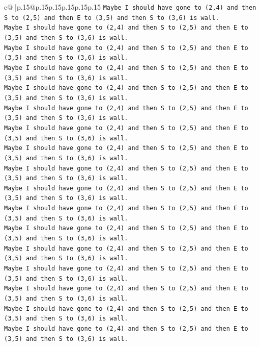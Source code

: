 \documentclass{article}
\begin{document}
{\begin{supertabular}{c@{$\;$}|p{.15\linewidth}@{}p{.15\linewidth}p{.15\linewidth}p{.15\linewidth}p{.15\linewidth}p{.15\linewidth}}
{{{\texttt{Maybe I should have gone to (2,4) and then S to (2,5) and then E to (3,5) and then S to (3,6) is wall.} \\
\texttt{Maybe I should have gone to (2,4) and then S to (2,5) and then E to (3,5) and then S to (3,6) is wall.} \\
\texttt{Maybe I should have gone to (2,4) and then S to (2,5) and then E to (3,5) and then S to (3,6) is wall.} \\
\texttt{Maybe I should have gone to (2,4) and then S to (2,5) and then E to (3,5) and then S to (3,6) is wall.} \\
\texttt{Maybe I should have gone to (2,4) and then S to (2,5) and then E to (3,5) and then S to (3,6) is wall.} \\
\texttt{Maybe I should have gone to (2,4) and then S to (2,5) and then E to (3,5) and then S to (3,6) is wall.} \\
\texttt{Maybe I should have gone to (2,4) and then S to (2,5) and then E to (3,5) and then S to (3,6) is wall.} \\
\texttt{Maybe I should have gone to (2,4) and then S to (2,5) and then E to (3,5) and then S to (3,6) is wall.} \\
\texttt{Maybe I should have gone to (2,4) and then S to (2,5) and then E to (3,5) and then S to (3,6) is wall.} \\
\texttt{Maybe I should have gone to (2,4) and then S to (2,5) and then E to (3,5) and then S to (3,6) is wall.} \\
\texttt{Maybe I should have gone to (2,4) and then S to (2,5) and then E to (3,5) and then S to (3,6) is wall.} \\
\texttt{Maybe I should have gone to (2,4) and then S to (2,5) and then E to (3,5) and then S to (3,6) is wall.} \\
\texttt{Maybe I should have gone to (2,4) and then S to (2,5) and then E to (3,5) and then S to (3,6) is wall.} \\
\texttt{Maybe I should have gone to (2,4) and then S to (2,5) and then E to (3,5) and then S to (3,6) is wall.} \\
\texttt{Maybe I should have gone to (2,4) and then S to (2,5) and then E to (3,5) and then S to (3,6) is wall.} \\
\texttt{Maybe I should have gone to (2,4) and then S to (2,5) and then E to (3,5) and then S to (3,6) is wall.} \\
\texttt{Maybe I should have gone to (2,4) and then S to (2,5) and then E to (3,5) and then S to (3,6) is wall.} \\
}}}
\end{supertabular}}
\end{document}
